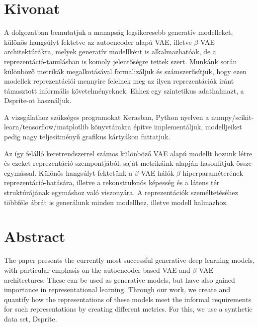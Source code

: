 \chapter*{Kivonat}

A dolgozatban bemutatjuk a manapság legsikeresebb generatív modelleket, különös hangsúlyt fektetve az autoencoder alapú VAE, illetve $\beta$-VAE architektúrákra, melyek generatív modellként is alkalmazhatóak, de a reprezentáció-tanulásban is komoly jelentőségre tettek szert. Munkánk során különböző metrikák megalkotásával formalizáljuk és számszerűsítjük, hogy ezen modellek reprezentációi mennyire felelnek meg az ilyen reprezentációk iránt támasztott informális követelményeknek. Ehhez egy szintetikus adathalmazt, a Dsprite-ot használjuk.

A vizsgálathoz szükséges programokat Kerasban, Python nyelven a numpy/scikit-learn/tensorflow/matplotlib könyvtárakra építve implementáljuk, modelljeiket pedig nagy teljesítményű grafikus kártyákon futtatjuk. 

Az így felálló keretrendszerrel számos különböző VAE alapú modellt hozunk létre és ezeket reprezentáció szempontjából, saját metrikáink alapján hasonlítjuk össze egymással. Különös hangsúlyt fektetünk a $\beta$-VAE hálók $\beta$ hiperparaméterének rep\-re\-zen\-táció-hatására, illetve a rekonstrukciós képesség és a látens tér struktúrájának egymáshoz való viszonyára. A reprezentációk személtetéséhez többféle ábrát is generálunk minden modellhez, illetve modell halmazhoz. 

\vfill

\chapter*{Abstract}

The paper presents the currently most successful generative deep learning models, with particular emphasis on the autoencoder-based VAE and $\beta$-VAE architectures. These  can be used as generative models, but have also gained importance in representational learning. Through our work, we create and quantify how the representations of these models meet the informal requirements for such representations by creating different metrics. For this, we use a synthetic data set, Dsprite.

